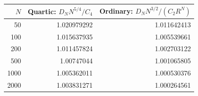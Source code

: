 \begin{tabular}{@{}rrr@{}}
\toprule
$N$ & Quartic: $D_NN^{5/4}/C_4$ & Ordinary: $D_NN^{3/2}/(C_2R^N)$ \\
\midrule
50 & 1.020979292 & 1.011642413 \\
100 & 1.015637935 & 1.005539661 \\
200 & 1.011457824 & 1.002703122 \\
500 & 1.00747044 & 1.001065805 \\
1000 & 1.005362011 & 1.000530376 \\
2000 & 1.003831271 & 1.000264561 \\
\bottomrule
\end{tabular}
